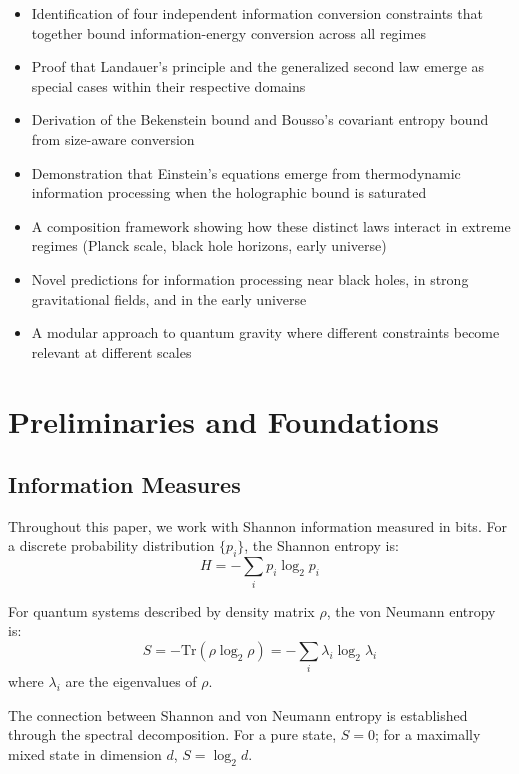 \documentclass[11pt,a4paper]{article}
\theoremstyle{plain}
\theoremstyle{definition}
\theoremstyle{remark}
\begin{document}
\begin{itemize}[leftmargin=*]
\item Identification of four independent information conversion constraints that together bound information-energy conversion across all regimes
\item Proof that Landauer's principle and the generalized second law emerge as special cases within their respective domains
\item Derivation of the Bekenstein bound and Bousso's covariant entropy bound from size-aware conversion
\item Demonstration that Einstein's equations emerge from thermodynamic information processing when the holographic bound is saturated
\item A composition framework showing how these distinct laws interact in extreme regimes (Planck scale, black hole horizons, early universe)
\item Novel predictions for information processing near black holes, in strong gravitational fields, and in the early universe
\item A modular approach to quantum gravity where different constraints become relevant at different scales
\end{itemize}

\section{Preliminaries and Foundations}
\label{sec:preliminaries}

\subsection{Information Measures}

Throughout this paper, we work with Shannon information measured in bits. For a discrete probability distribution $\{p_i\}$, the Shannon entropy is:
\begin{equation}
H = -\sum_i p_i \log_2 p_i
\end{equation}

For quantum systems described by density matrix $\rho$, the von Neumann entropy is:
\begin{equation}
S = -\text{Tr}(\rho\log_2\rho) = -\sum_i\lambda_i\log_2\lambda_i
\end{equation}
where $\lambda_i$ are the eigenvalues of $\rho$.

The connection between Shannon and von Neumann entropy is established through the spectral decomposition. For a pure state, $S=0$; for a maximally mixed state in dimension $d$, $S=\log_2 d$.
\end{document}
